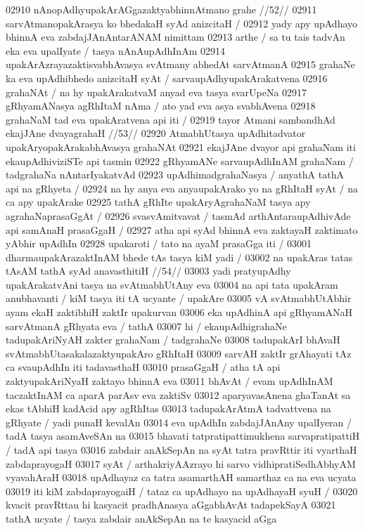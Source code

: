 02910 	nAnopAdhyupakArAGgazaktyabhinnAtmano grahe //52//
02911 	sarvAtmanopakArasya ko bhedakaH syAd anizcitaH /
02912 yady apy upAdhayo bhinnA eva zabdajJAnAntarANAM nimittam 
02913 arthe / sa tu tais tadvAn eka eva upalIyate / tasya nAnAupAdhInAm 
02914 upakArAzrayazaktisvabhAvasya svAtmany abhedAt sarvAtmanA 
02915 grahaNe ka eva upAdhibhedo anizcitaH syAt / sarvaupAdhyupakArakatvena
02916 grahaNAt / na hy upakArakatvaM anyad eva tasya svarUpeNa
02917 gRhyamANasya agRhItaM nAma / ato yad eva asya svabhAvena  
02918 grahaNaM tad eva upakAratvena api iti / 
02919 	tayor Atmani sambandhAd ekajJAne dvayagrahaH //53// 
02920 AtmabhUtasya upAdhitadvator upakAryopakArakabhAvasya grahaNAt  
02921 ekajJAne dvayor api grahaNam iti ekaupAdhiviziSTe api tasmin
02922 gRhyamANe sarvaupAdhInAM grahaNam / tadgrahaNa nAntarIyakatvAd  
02923 upAdhimadgrahaNasya / anyathA tathA api na gRhyeta /
02924 na hy anya eva anyaupakArako yo na gRhItaH syAt / na ca apy upakArake
02925 tathA gRhIte upakAryAgrahaNaM tasya apy agrahaNaprasaGgAt /  
02926 svasvAmitvavat / tasmAd arthAntaraupAdhivAde api samAnaH prasaGgaH /
02927 atha api syAd bhinnA eva zaktayaH zaktimato yAbhir upAdhIn  
02928 upakaroti / tato na ayaM prasaGga iti /  
03001 	dharmaupakArazaktInAM bhede tAs tasya kiM yadi /
03002 	na upakAras tatas tAsAM tathA syAd anavasthitiH //54// 
03003 yadi pratyupAdhy upakArakatvAni tasya na svAtmabhUtAny eva 
03004 na api tata upakAram anubhavanti / kiM tasya iti tA ucyante / upakAre 
03005 vA svAtmabhUtAbhir ayam ekaH zaktibhiH zaktIr upakurvan  
03006 eka upAdhinA api gRhyamANaH sarvAtmanA gRhyata eva / tathA 
03007 hi / ekaupAdhigrahaNe tadupakAriNyAH zakter grahaNam / tadgrahaNe  
03008 tadupakArI bhAvaH svAtmabhUtasakalazaktyupakAro gRhItaH  
03009 sarvAH zaktIr grAhayati tAz ca svaupAdhIn iti tadavasthaH
03010 prasaGgaH / atha tA api zaktyupakAriNyaH zaktayo bhinnA eva  
03011 bhAvAt / evam upAdhInAM taczaktInAM ca aparA parAsv eva zaktiSv 
03012 aparyavasAnena ghaTanAt sa ekas tAbhiH kadAcid apy agRhItas 
03013 tadupakArAtmA tadvattvena na gRhyate / yadi punaH kevalAn 
03014 eva upAdhIn zabdajJAnAny upalIyeran / tadA tasya asamAveSAn na
03015 bhavati tatpratipattimukhena sarvapratipattiH / tadA api tasya  
03016 zabdair anAkSepAn na syAt tatra pravRttir iti vyarthaH zabdaprayogaH  
03017 syAt / arthakriyAAzrayo hi sarvo vidhipratiSedhAbhyAM vyavahAraH  
03018 upAdhayaz ca tatra asamarthAH samarthaz ca na eva ucyata 
03019 iti kiM zabdaprayogaiH / tataz ca upAdhayo na upAdhayaH syuH /
03020 kvacit pravRttau hi kasyacit pradhAnasya aGgabhAvAt tadapekSayA  
03021 tathA ucyate / tasya zabdair anAkSepAn na te kasyacid aGga
